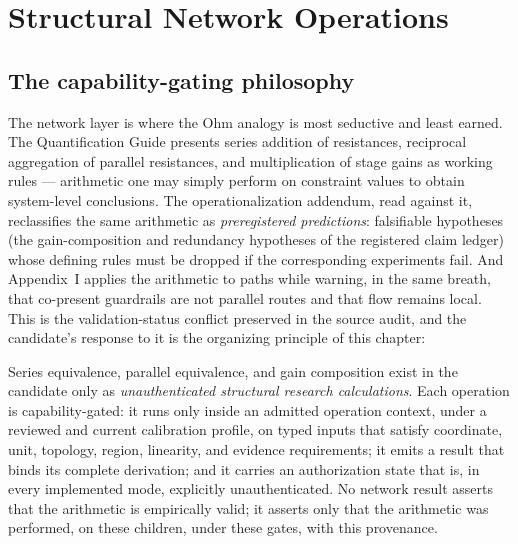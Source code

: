 \chapter{Structural Network Operations}\label{ch09:networks}

\section{The capability-gating philosophy}\label{ch09:sec:philosophy}

The network layer is where the Ohm analogy is most seductive and least
earned. The Quantification Guide presents series addition of resistances,
reciprocal aggregation of parallel resistances, and multiplication of stage
gains as working rules --- arithmetic one may simply perform on constraint
values to obtain system-level conclusions. The operationalization addendum,
read against it, reclassifies the same arithmetic as \emph{preregistered
predictions}: falsifiable hypotheses (the gain-composition and redundancy
hypotheses of the registered claim ledger) whose defining rules must be
dropped if the corresponding experiments fail. And Appendix~I applies the
arithmetic to paths while warning, in the same breath, that co-present
guardrails are not parallel routes and that flow remains local. This is the
validation-status conflict preserved in the source audit, and the candidate's
response to it is the organizing principle of this chapter:

\begin{ruleenv}\label{ch09:rule:structural}
Series equivalence, parallel equivalence, and gain composition exist in the
candidate only as \emph{unauthenticated structural research calculations}.
Each operation is capability-gated: it runs only inside an admitted
operation context, under a reviewed and current calibration profile, on
typed inputs that satisfy coordinate, unit, topology, region, linearity,
and evidence requirements; it emits a result that binds its complete
derivation; and it carries an authorization state that is, in every
implemented mode, explicitly unauthenticated. No network result asserts
that the arithmetic is empirically valid; it asserts only that the
arithmetic was performed, on these children, under these gates, with this
provenance.
\end{ruleenv}

